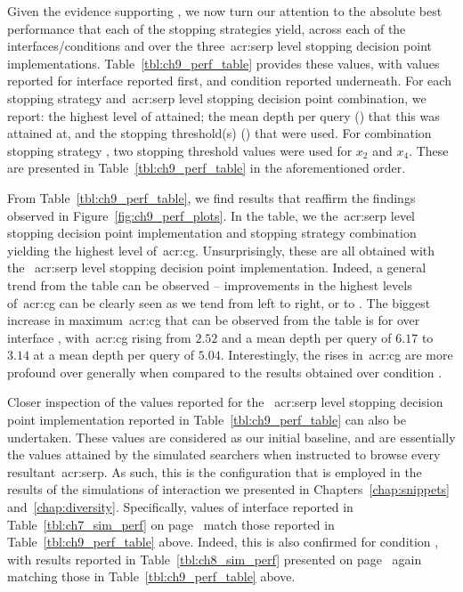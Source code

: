 Given the evidence supporting , we now turn our attention to the absolute best performance that each of the stopping strategies yield, across each of the interfaces/conditions and over the three~\gls{acr:serp} level stopping decision point implementations. Table~\ref{tbl:ch9_perf_table} provides these values, with values reported for interface  reported first, and condition  reported underneath. For each stopping strategy and~\gls{acr:serp} level stopping decision point combination, we report: the highest level of  attained; the mean depth per query () that this was attained at, and the stopping threshold(s) () that were used. For combination stopping strategy , two stopping threshold values were used for $x_2$ and $x_4$. These are presented in Table~\ref{tbl:ch9_perf_table} in the aforementioned order.

From Table~\ref{tbl:ch9_perf_table}, we find results that reaffirm the findings observed in Figure~\ref{fig:ch9_perf_plots}. In the table, we  the~\gls{acr:serp} level stopping decision point implementation and stopping strategy combination yielding the highest level of~\gls{acr:cg}. Unsurprisingly, these are all obtained with the ~\gls{acr:serp} level stopping decision point implementation. Indeed, a general trend from the table can be observed -- improvements in the highest levels of~\gls{acr:cg} can be clearly seen as we tend from left to right, or  to . The biggest increase in maximum~\gls{acr:cg} that can be observed from the table is for  over interface , with~\gls{acr:cg} rising from $2.52$ and a mean depth per query of $6.17$ to $3.14$ at a mean depth per query of $5.04$. Interestingly, the rises in~\gls{acr:cg} are more profound over  generally when compared to the results obtained over condition .

Closer inspection of the values reported for the ~\gls{acr:serp} level stopping decision point implementation reported in Table~\ref{tbl:ch9_perf_table} can also be undertaken. These values are considered as our initial baseline, and are essentially the values attained by the simulated searchers when instructed to browse every resultant~\gls{acr:serp}. As such, this is the configuration that is employed in the results of the simulations of interaction we presented in Chapters~\ref{chap:snippets} and~\ref{chap:diversity}. Specifically, values of interface  reported in Table~\ref{tbl:ch7_sim_perf} on page~\pageref{tbl:ch7_sim_perf} match those reported in Table~\ref{tbl:ch9_perf_table} above. Indeed, this is also confirmed for condition , with results reported in Table~\ref{tbl:ch8_sim_perf} presented on page~\pageref{tbl:ch8_sim_perf} again matching those in Table~\ref{tbl:ch9_perf_table} above.

